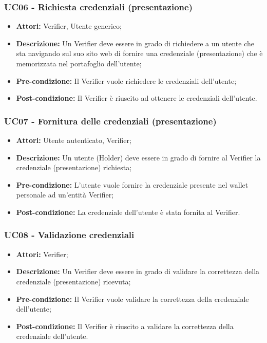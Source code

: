 \subsubsection{UC06 - Richiesta credenziali (presentazione)}
\begin{itemize}
\item \textbf{Attori:} Verifier, Utente generico;
\item \textbf{Descrizione:} Un Verifier deve essere in grado di richiedere a un utente che sta navigando sul suo sito web di fornire una credenziale (presentazione) che è memorizzata nel portafoglio dell'utente;
\item \textbf{Pre-condizione:} Il Verifier vuole richiedere le credenziali dell’utente;
\item \textbf{Post-condizione:} Il Verifier è riuscito ad ottenere le credenziali dell’utente.
\end{itemize}

\subsubsection{UC07 - Fornitura delle credenziali (presentazione)}
\begin{itemize}
\item \textbf{Attori:} Utente autenticato, Verifier;
\item \textbf{Descrizione:} Un utente (Holder) deve essere in grado di fornire al Verifier la credenziale (presentazione) richiesta;
\item \textbf{Pre-condizione:} L’utente vuole fornire la credenziale presente nel wallet personale ad un'entità Verifier;
\item \textbf{Post-condizione:} La credenziale dell’utente è stata fornita al Verifier.
\end{itemize}

\subsubsection{UC08 - Validazione credenziali}
\begin{itemize}
\item \textbf{Attori:} Verifier;
\item \textbf{Descrizione:} Un Verifier deve essere in grado di validare la correttezza della credenziale (presentazione) ricevuta;
\item \textbf{Pre-condizione:} Il Verifier vuole validare la correttezza della credenziale dell’utente;
\item \textbf{Post-condizione:} Il Verifier è riuscito a validare la correttezza della credenziale dell’utente.
\end{itemize}